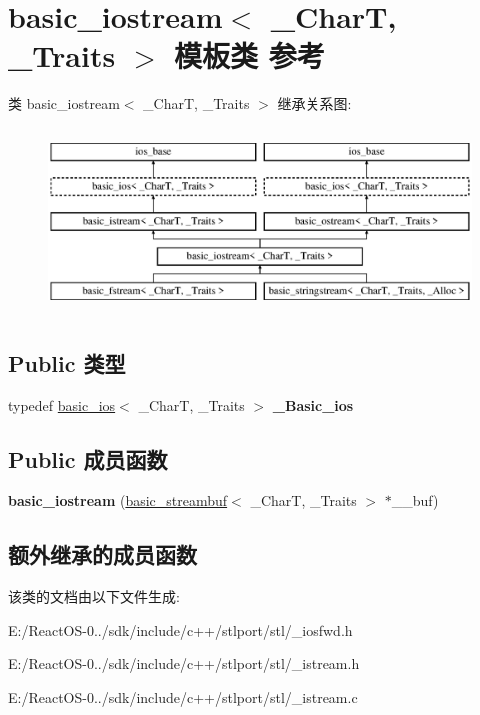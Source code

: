 \hypertarget{classbasic__iostream}{}\section{basic\+\_\+iostream$<$ \+\_\+\+CharT, \+\_\+\+Traits $>$ 模板类 参考}
\label{classbasic__iostream}
类 basic\+\_\+iostream$<$ \+\_\+\+CharT, \+\_\+\+Traits $>$ 继承关系图\+:\begin{figure}[H]
\begin{center}
\leavevmode
\includegraphics[height=4.946997cm]{classbasic__iostream}
\end{center}
\end{figure}
\subsection*{Public 类型}
\begin{DoxyCompactItemize}
\item 
\mbox{\label{classbasic__iostream_ad19b614b216849f5f67d49547b7641fd}} 
typedef \hyperlink{classbasic__ios}{basic\+\_\+ios}$<$ \+\_\+\+CharT, \+\_\+\+Traits $>$ {\bfseries \+\_\+\+Basic\+\_\+ios}
\end{DoxyCompactItemize}
\subsection*{Public 成员函数}
\begin{DoxyCompactItemize}
\item 
\mbox{\label{classbasic__iostream_a9131e60ed401de6353558b4416dbab75}} 
{\bfseries basic\+\_\+iostream} (\hyperlink{classbasic__streambuf}{basic\+\_\+streambuf}$<$ \+\_\+\+CharT, \+\_\+\+Traits $>$ $\ast$\+\_\+\+\_\+buf)
\end{DoxyCompactItemize}
\subsection*{额外继承的成员函数}


该类的文档由以下文件生成\+:\begin{DoxyCompactItemize}
\item 
E\+:/\+React\+O\+S-\/0../sdk/include/c++/stlport/stl/\+\_\+iosfwd.\+h\item 
E\+:/\+React\+O\+S-\/0../sdk/include/c++/stlport/stl/\+\_\+istream.\+h\item 
E\+:/\+React\+O\+S-\/0../sdk/include/c++/stlport/stl/\+\_\+istream.\+c\end{DoxyCompactItemize}
